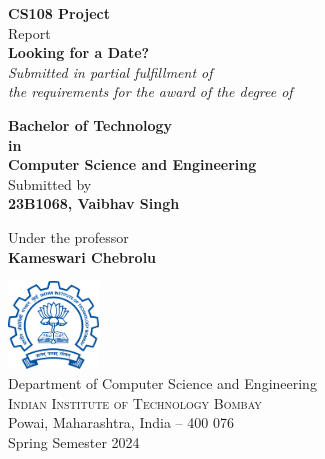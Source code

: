 \begin{titlepage}

\begin{center}

\textup{\small {\bf CS108 Project} \\ Report}\\[0.2in]

\Large \textbf {Looking for a Date?}\\[0.5in]

       \small \emph{Submitted in partial fulfillment of\\
        the requirements for the award of the degree of}
        \vspace{.2in}

       {\bf Bachelor of Technology \\in\\ Computer Science and Engineering}\\[0.5in]

\normalsize Submitted by \\
\textbf{23B1068, Vaibhav Singh}

\vspace{.1in}
Under the professor\\
{\textbf{Kameswari Chebrolu}}\\[0.2in]

\vfill

\includegraphics[width=0.18\textwidth]{./iitb-logo}\\[0.1in]
\Large{Department of Computer Science and Engineering}\\
\normalsize
\textsc{Indian Institute of Technology Bombay}\\
Powai, Maharashtra, India -- 400 076 \\
\vspace{0.2cm}
Spring Semester 2024

\end{center}

\end{titlepage}
